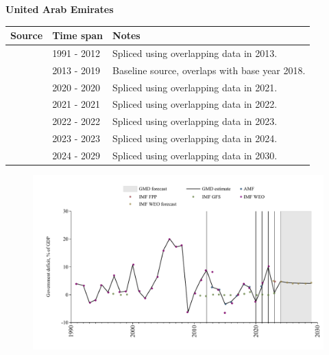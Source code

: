 \documentclass[12pt,a4paper,landscape]{article}
\begin{document}
\begin{adjustbox}{max totalsize={\paperwidth}{\paperheight},center}
\begin{minipage}[t][\textheight][t]{\textwidth}
\vspace*{0.5cm}
{}
\begin{center}
{\Large\bfseries United Arab Emirates}
\end{center}
\vspace{0.5cm}
\begin{table}[H]
\centering
\small
\begin{tabular}{|l|l|l|}
\hline
\textbf{Source} & \textbf{Time span} & \textbf{Notes} \\
\hline
\rowcolor{white}\cite{IMF_WEO}& 1991 - 2012 &Spliced using overlapping data in 2013.\\
\rowcolor{lightgray}\cite{AMF}& 2013 - 2019 &Baseline source, overlaps with base year 2018.\\
\rowcolor{white}\cite{IMF_WEO}& 2020 - 2020 &Spliced using overlapping data in 2021.\\
\rowcolor{lightgray}\cite{AMF}& 2021 - 2021 &Spliced using overlapping data in 2022.\\
\rowcolor{white}\cite{IMF_WEO}& 2022 - 2022 &Spliced using overlapping data in 2023.\\
\rowcolor{lightgray}\cite{IMF_GFS}& 2023 - 2023 &Spliced using overlapping data in 2024.\\
\rowcolor{white}\cite{IMF_WEO_forecast}& 2024 - 2029 &Spliced using overlapping data in 2030.\\
\hline
\end{tabular}
\end{table}
\begin{figure}[H]
\centering
\includegraphics[width=\textwidth,height=0.6\textheight,keepaspectratio]{graphs/ARE_govdef_GDP.pdf}
\end{figure}
\end{minipage}
\end{adjustbox}
\end{document}
